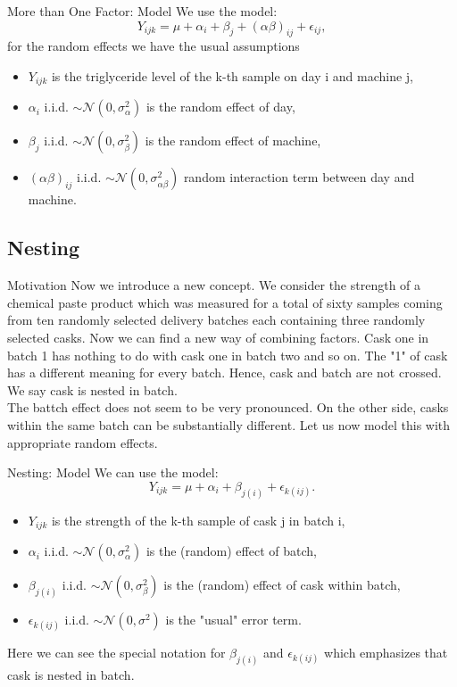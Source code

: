 \documentclass[unknownkeysallowed]{beamer}
\begin{document}
	\begin{frame}{More than One Factor: Model}
		We use the model:
		\begin{equation*}
		Y_{ijk} = \mu + \alpha_i + \beta_j + (\alpha \beta)_{ij} + \epsilon_{ij},
		\end{equation*}
		for the random effects we have the usual assumptions
		\begin{itemize}
			\item $Y_{ijk}$ is the triglyceride level of the k-th sample on day i and machine j,
			\item $\alpha_i$ i.i.d.  
			$\sim \mathcal{N}(0,\sigma^2_{\alpha})$ is the random effect of day,
			\item $\beta_j$ i.i.d.  
			$\sim \mathcal{N}(0,\sigma^2_{\beta})$ is the random effect of machine,
			\item $(\alpha \beta)_{ij}$ i.i.d.  
			$\sim \mathcal{N}(0,\sigma^2_{\alpha \beta})$ random interaction term between day and machine.
		\end{itemize}
	\end{frame}
	
	\subsection{Nesting}
	\begin{frame}{Motivation}
		Now we introduce a new concept. We consider the strength of a chemical paste product which was measured for a total of sixty samples coming from ten randomly selected delivery batches each containing three randomly selected casks. Now we can find a new way of combining factors. Cask one in batch 1 has nothing to do with cask one in batch two and so on. The "1" of cask has a different meaning for every batch. Hence, cask and batch are not crossed. We say cask is nested in batch.\\
		The battch effect does not seem to be very pronounced. On the other side, casks within the same batch can be substantially different. Let us now model this with appropriate random effects.
	\end{frame}
	
	
	\begin{frame}{Nesting: Model}
		We can use the model:
		\begin{equation*}
		Y_{ijk} = \mu + \alpha_i + \beta_{j(i)} + \epsilon_{k(ij)}.
		\end{equation*}
		\begin{itemize}
			\item $Y_{ijk}$ is the strength of the k-th sample of cask j in batch i,
			\item $\alpha_i$ i.i.d.  
			$\sim \mathcal{N}(0,\sigma^2_{\alpha})$ is the (random) effect of batch,
			\item $\beta_{j(i)}$ i.i.d.  
			$\sim \mathcal{N}(0,\sigma^2_{\beta})$ is the (random) effect of cask within batch,
			\item $\epsilon_{k(ij)}$ i.i.d.  
			$\sim \mathcal{N}(0,\sigma^2)$ is the "usual" error term.
		\end{itemize}
		Here we can see the special notation for $\beta_{j(i)}$ and $\epsilon_{k(ij)}$ which emphasizes that cask is nested in batch.
	\end{frame}
	
\end{document}
